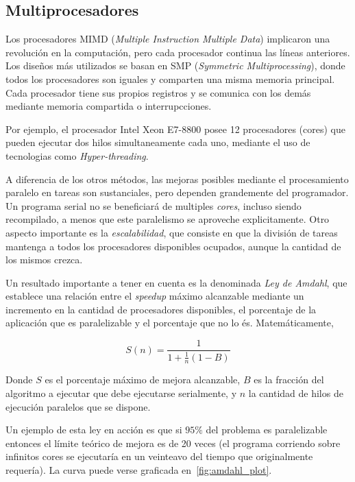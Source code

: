\subsection{Multiprocesadores}

Los procesadores MIMD (\textit{Multiple Instruction Multiple Data}) implicaron una revoluci\'on en la computaci\'on, pero
cada procesador continua las l\'ineas anteriores.  Los dise\~nos m\'as utilizados se basan en SMP (\textit{Symmetric
Multiprocessing}), donde todos los procesadores son iguales y comparten una misma memoria principal. Cada procesador tiene
sus propios registros y se comunica con los dem\'as mediante memoria compartida o interrupcciones.

Por ejemplo, el procesador Intel Xeon E7-8800 posee 12 procesadores (cores) que pueden ejecutar dos hilos simultaneamente
cada uno, mediante el uso de tecnologias como \textit{Hyper-threading}.

A diferencia de los otros m\'etodos, las mejoras posibles mediante el procesamiento paralelo en tareas son sustanciales,
pero dependen grandemente del programador. Un programa serial no se beneficiar\'a de multiples \textit{cores},
incluso siendo recompilado, a menos que este paralelismo se aproveche explicitamente. Otro aspecto importante es la
\textit{escalabilidad}, que consiste en que la divisi\'on de tareas mantenga a todos los procesadores disponibles ocupados,
aunque la cantidad de los mismos crezca.

Un resultado importante a tener en cuenta es la denominada \textit{Ley de Amdahl}, que establece una relaci\'on entre
el \textit{speedup} m\'aximo alcanzable mediante un incremento en la cantidad de procesadores disponibles, el porcentaje
de la aplicaci\'on que es paralelizable y el porcentaje que no lo \'es. Matem\'aticamente,

\begin{equation}
    \label{eq:amdahl}
    S(n) = \frac{1}{1 + \frac{1}{n} (1 - B)}
\end{equation}

Donde $S$ es el porcentaje m\'aximo de mejora alcanzable, $B$ es la fracci\'on del algoritmo a ejecutar que debe ejecutarse
serialmente, y $n$ la cantidad de hilos de ejecuci\'on paralelos que se dispone.

Un ejemplo de esta ley en acci\'on es que si $95 \%$ del problema es paralelizable entonces el l\'imite te\'orico de
mejora es de 20 veces (el programa corriendo sobre infinitos cores se ejecutar\'ia en un veinteavo del tiempo que originalmente
requer\'ia). La curva puede verse graficada en~\ref{fig:amdahl_plot}.


